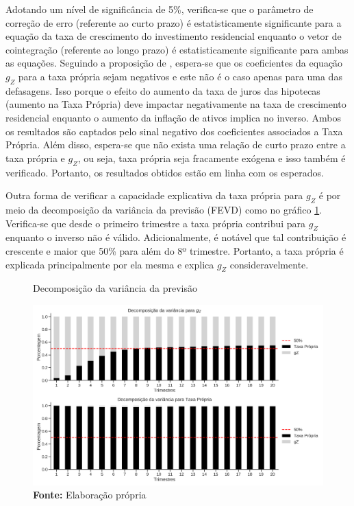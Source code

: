 Adotando um nível de significância de 5\%, verifica-se que o parâmetro de correção de erro (referente ao curto prazo) é estatisticamente significante para a equação da taxa de crescimento do investimento residencial enquanto o vetor de cointegração (referente ao longo prazo) é estatisticamente significante para ambas as equações. Seguindo a proposição de \textcite{teixeira_crescimento_2015}, espera-se que os coeficientes da equação $g_Z$ para a taxa própria sejam negativos e este não é o caso apenas para uma das defasagens. Isso porque o efeito do aumento da taxa de juros das hipotecas (aumento na Taxa Própria) deve impactar negativamente na taxa de crescimento residencial enquanto o aumento da inflação de ativos implica no inverso. Ambos os resultados são captados pelo sinal negativo dos coeficientes associados a Taxa Própria.
Além disso, espera-se que não exista uma relação de curto prazo entre a taxa própria e $g_Z$, ou seja, taxa própria seja fracamente exógena e isso também é verificado. Portanto, os resultados obtidos estão em linha com os esperados. 

Outra forma de verificar a capacidade explicativa da taxa própria para $g_Z$ é por meio da decomposição da variância da previsão (FEVD) como no gráfico \ref{fevd}. Verifica-se que desde o primeiro trimestre a taxa própria contribui para $g_Z$ enquanto o inverso não é válido. Adicionalmente, é notável que tal contribuição é crescente e maior que 50\% para além do 8º trimestre. Portanto, a taxa própria é explicada principalmente por ela mesma e explica $g_Z$ consideravelmente.

\begin{figure}[htb]
	\centering
	\caption{Decomposição da variância da previsão}
	\label{fevd}
	\includegraphics[width=\textwidth]{Fatos_Estilizados/Figs/FEVD_VECM.png}
	\caption*{\textbf{Fonte:} Elaboração própria}
\end{figure}

